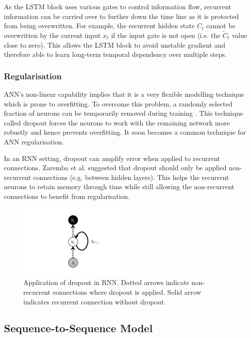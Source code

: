 \documentclass[11pt]{article} %
\theoremstyle{plain}
\theoremstyle{definition}
\begin{document}
As the LSTM block uses various gates to control information flow, recurrent information can be carried over to further down the time line as it is protected from being overwritten. For example, the recurrent hidden state \(C_t\) cannot be overwritten by the current input \(x_t\) if the input gate is not open (i.e. the \(\tilde{C}_t\) value close to zero). This allows the LSTM block to avoid unstable gradient and therefore able to learn long-term temporal dependency over multiple steps.


\subsubsection{Regularisation}

ANN’s non-linear capability implies that it is a very flexible modelling technique which is prone to overfitting. To overcome this problem, a randomly selected fraction of neurons can be temporarily removed during training \cite{srivastava2014}. This technique called dropout forces the neurons to work with the remaining network more robustly and hence prevents overfitting. It soon becomes a common technique for ANN regularisation.

In an RNN setting, dropout can amplify error when applied to recurrent connections. Zaremba et al. \cite{zaremba2014} suggested that dropout should only be applied non-recurrent connections (e.g. between hidden layers). This helps the recurrent neurons to retain memory through time while still allowing the non-recurrent connections to benefit from regularisation.

\begin{figure}[H]
	\centering
	\includegraphics[width=0.5\textwidth]{dropout.PNG}
	\caption{Application of dropout in RNN. Dotted arrows indicate non-recurrent connections where dropout is applied. Solid arrow indicates recurrent connection without dropout.}
	\label{fig:dropout}
\end{figure}

\subsection{Sequence-to-Sequence Model}
\end{document}
